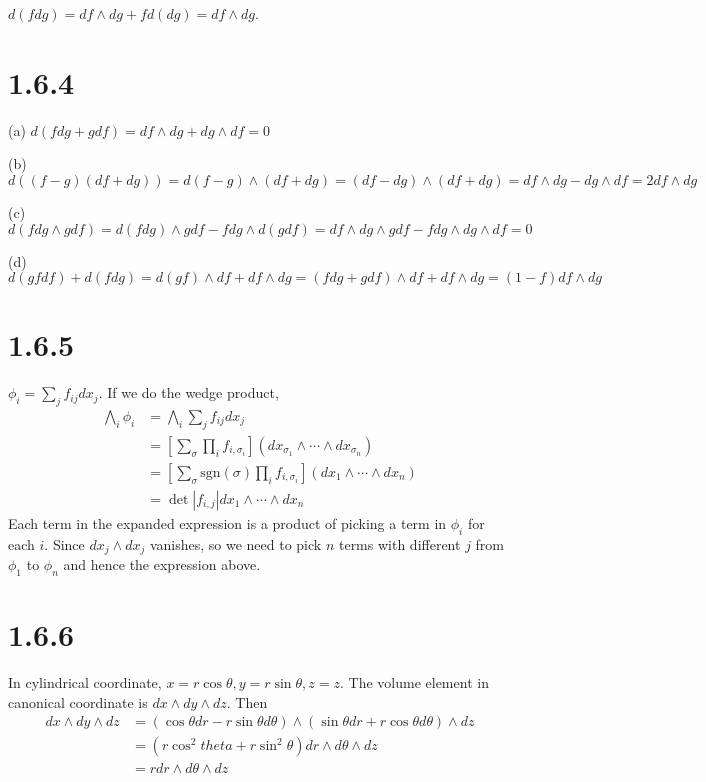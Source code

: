 \documentclass[12pt]{article}
\begin{document}
$d(fdg) = df \wedge dg + f d(dg) = df \wedge dg$.

\section*{1.6.4}
(a) $d(fdg + gdf) = df\wedge dg + dg \wedge df = 0$

(b) $d((f -g)(df + dg))= d(f-g) \wedge (df + dg) = (df - dg) \wedge (df + dg) = df \wedge dg - dg \wedge df = 2 df \wedge dg$

(c) $d(fdg \wedge g df) = d(fdg) \wedge gdf - fdg \wedge d(gdf) = df \wedge dg \wedge g df - f dg \wedge dg \wedge df = 0$

(d) $d(gfdf) + d(fdg) = d(gf) \wedge df + df \wedge dg = (fdg + gdf)\wedge df + df \wedge dg = (1 - f)df \wedge dg$

\section*{1.6.5}
$ \phi_i = \sum_j f_{ij} dx_j$.  If we do the wedge product, 
$$ \begin{aligned}
	\bigwedge_i \phi_i &= \bigwedge_i \sum_j f_{ij} dx_j \\
					   &= \left[\sum_{\sigma} \prod_i f_{i, \sigma_i} \right](dx_{\sigma_1} \wedge \cdots \wedge dx_{\sigma_n}) \\
					   &= \left[\sum_{\sigma} \mbox{sgn}(\sigma) \prod_i f_{i, \sigma_i} \right](dx_1 \wedge \cdots \wedge dx_n) \\
					   &= \det|f_{i,j}| dx_1 \wedge \cdots \wedge dx_n
\end{aligned} $$
Each term in the expanded expression is a product of picking a term in $\phi_i$ for each $i$. Since $dx_j \wedge dx_j$ vanishes, so we need to pick $n$ terms with different $j$ from $\phi_1$ to $\phi_n$ and hence the expression above. 

\section*{1.6.6}
In cylindrical coordinate, $x = r\cos \theta, y=r\sin \theta, z = z$. The volume element in canonical coordinate is $dx \wedge dy \wedge dz$. Then $$
\begin{aligned}
	dx \wedge dy \wedge dz &= (\cos\theta dr - r\sin \theta d\theta) \wedge (\sin \theta dr + r\cos\theta d\theta) \wedge dz \\
	  &= (r\cos^2 theta + r\sin^2\theta) dr \wedge d\theta \wedge dz   \\
	  &= r dr \wedge d\theta \wedge dz
\end{aligned}
$$
\end{document}
